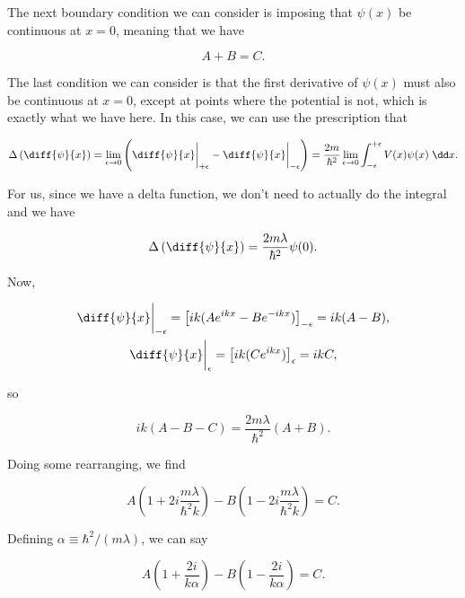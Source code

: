 The next boundary condition we can consider is imposing that $\psi(x)$ be continuous at $x = 0$, meaning that we have

\begin{equation}
  A + B = C.
\end{equation}

The last condition we can consider is that the first derivative of $\psi(x)$ must also be continuous at $x=0$, except at points where the potential is not, which is exactly what we have here. In this case, we can use the prescription that

\begin{equation}
  \Delta\left(\diff{\psi}{x}\right) = \lim_{\epsilon \rightarrow 0} \left(\diff{\psi}{x}\bigg|_{+\epsilon} - \diff{\psi}{x}\bigg|_{-\epsilon}\right) = \frac{2m}{\hbar^2} \lim_{\epsilon \rightarrow 0} \int_{-\epsilon}^{+\epsilon} V(x)\psi(x) \;\dd x.
\end{equation}

For us, since we have a delta function, we don't need to actually do the integral and we have

\begin{equation}
  \Delta\left(\diff{\psi}{x}\right) = \frac{2m\lambda}{\hbar^2}\psi(0). 
\end{equation}

Now,

\begin{gather}
  \diff{\psi}{x}\bigg|_{-\epsilon} = \left[ik(Ae^{ikx} - Be^{-ikx})\right]_{-\epsilon} = ik(A - B), \\
  \diff{\psi}{x}\bigg|_{\epsilon} = \left[ik(Ce^{ikx})\right]_{\epsilon} = ikC, \\
\end{gather}

so

\begin{equation}
  ik(A - B - C) = \frac{2m\lambda}{\hbar^2}(A + B).
\end{equation}

Doing some rearranging, we find

\begin{equation}
  A\left(1 + 2i \frac{m\lambda}{\hbar^2k}\right) - B\left(1 - 2i \frac{m\lambda}{\hbar^2k}\right) = C.
\end{equation}

Defining $\alpha \equiv \hbar^2/(m\lambda)$, we can say

\begin{equation}
  A\left(1 + \frac{2i}{k\alpha}\right) - B\left(1 - \frac{2i}{k\alpha}\right) = C.
\end{equation}

